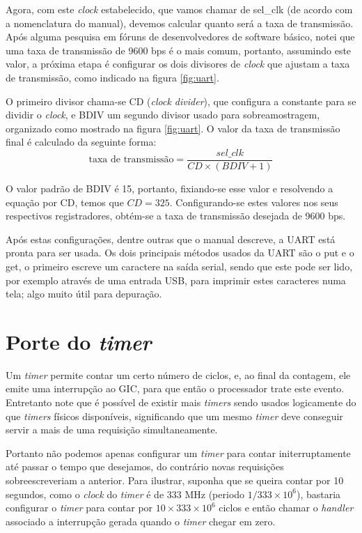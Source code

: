 \documentclass{ufscThesis/ufscThesis} %
\begin{document}
Agora, com este \emph{clock} estabelecido, que vamos chamar de sel\_clk (de acordo com a nomenclatura do manual), devemos calcular quanto será a taxa de transmissão.
Após alguma pesquisa em fóruns de desenvolvedores de software básico, notei que uma taxa de transmissão de 9600 bps é o mais comum, portanto, assumindo este valor, a próxima etapa é configurar os dois divisores de \emph{clock} que ajustam a taxa de transmissão, como indicado na figura \ref{fig:uart}.

O primeiro divisor chama-se CD (\emph{clock divider}), que configura a constante para se dividir o \emph{clock}, e BDIV um segundo divisor usado para sobreamostragem, organizado como mostrado na figura \ref{fig:uart}. O valor da taxa de transmissão final é calculado da seguinte forma:
\begin{equation}
	\text{taxa de transmissão} = \frac{sel\_clk}{CD \times (BDIV+1)}
\end{equation}

O valor padrão de BDIV é 15, portanto, fixiando-se esse valor e resolvendo a equação por CD, temos que $CD = 325$. Configurando-se estes valores nos seus respectivos registradores, obtém-se a taxa de transmissão desejada de 9600 bps.

Após estas configurações, dentre outras que o manual descreve, a UART está pronta para ser usada. Os dois principais métodos usados da UART são o put e o get, o primeiro escreve um caractere na saída serial, sendo que este pode ser lido, por exemplo através de uma entrada USB, para imprimir estes caracteres numa tela; algo muito útil para depuração.

\section{Porte do \emph{timer}}



Um \emph{timer} permite contar um certo número de ciclos, e, ao final da contagem, ele emite uma interrupção ao GIC, para que então o processador trate este evento. Entretanto note que é possível de existir mais \emph{timers} sendo usados logicamente do que \emph{timers} físicos disponíveis, significando que um mesmo \emph{timer} deve conseguir servir a mais de uma requisição simultaneamente.

Portanto não podemos apenas configurar um \emph{timer} para contar initerruptamente até passar o tempo que desejamos, do contrário novas requisições sobreescreveriam a anterior. Para ilustrar, suponha que se queira contar por 10 segundos, como o \emph{clock} do \emph{timer} é de 333 MHz (periodo $1/333 \times 10^6$), bastaria configurar o \emph{timer} para contar por $10 \times 333 \times 10^6$ ciclos e então chamar o \emph{handler} associado a interrupção gerada quando o \emph{timer} chegar em zero.
\end{document}
